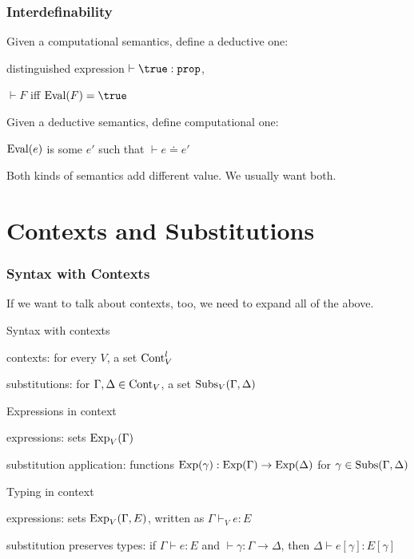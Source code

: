 \begin{frame}\frametitle{Interdefinability}
\begin{blockitems}{Given a computational semantics, define a deductive one:}
\item distinguished expression $\vdash \true:\prop$,
\item $\vdash F$ iff $\Eval(F)=\true$
\end{blockitems}

\begin{blockitems}{Given a deductive semantics, define computational one:}
\item $\mathrm{Eval}(e)$ is some $e'$ such that $\vdash e\doteq e'$
\end{blockitems}

Both kinds of semantics add different value. We usually want both.
\end{frame}

\section{Contexts and Substitutions}

\begin{frame}\frametitle{Syntax with Contexts}
If we want to talk about contexts, too, we need to expand all of the above.

\begin{blockitems}{Syntax with contexts}
\item contexts: for every $V$, a set $\mathrm{Cont}^l_V$
\item substitutions: for $\Gamma,\Delta\in\mathrm{Cont}_V$, a set $\mathrm{Subs}_V(\Gamma,\Delta)$
\end{blockitems}

\begin{blockitems}{Expressions in context}
\item expressions: sets $\mathrm{Exp}_V(\Gamma)$
\item substitution application: functions $\mathrm{Exp}(\gamma):\mathrm{Exp}(\Gamma)\to\mathrm{Exp}(\Delta)$ for $\gamma\in\mathrm{Subs}(\Gamma,\Delta)$
\end{blockitems}

\begin{blockitems}{Typing in context}
\item expressions: sets $\mathrm{Exp}_V(\Gamma,E)$, written as $\Gamma\vdash_V e: E$
\item substitution preserves types: if $\Gamma\vdash e:E$ and $\vdash \gamma:\Gamma\to\Delta$, then $\Delta\vdash e[\gamma]:E[\gamma]$
\end{blockitems}
\end{frame}

